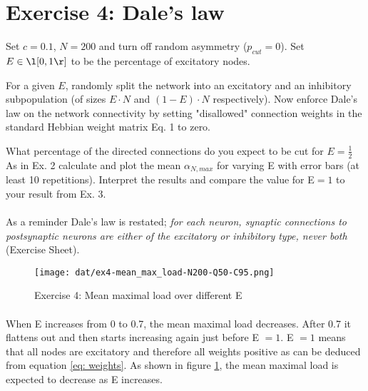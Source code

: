 \section{Exercise 4: Dale's law}

\begin{itshape}
\small
Set $c=0.1$, $N = 200$ and turn off random asymmetry ($p_{cut} = 0$). Set $E \in \l[0, 1\r]$ to be the percentage of excitatory nodes.

For a given $E$, randomly split the network into an excitatory and an inhibitory subpopulation (of sizes $E \cdot N$ and $(1 - E) \cdot N$ respectively). Now enforce Dale's law on the network connectivity by setting "disallowed" connection weights in the standard Hebbian weight matrix Eq. 1 to zero.

What percentage of the directed connections do you expect to be cut for $E = \frac{1}{2}$
As in Ex. 2 calculate and plot the mean $\alpha_{N,max}$ for varying E with error bars (at least 10 repetitions). Interpret the results and compare the value for E$ = 1$ to your result from Ex. 3.
\end{itshape}

\paragraph*{}

As a reminder Dale's law is restated; \textit{for each neuron, synaptic connections to postsynaptic neurons are either of the excitatory or inhibitory type, never both} (Exercise Sheet).

\begin{figure}[H]
  \begin{center}
    \texttt{[image: dat/ex4-mean\_max\_load-N200-Q50-C95.png]}
  \end{center}
  \vspace{-20pt}
  \caption{Exercise 4: Mean maximal load over different E}
  \label{fig: exercise 4}
\end{figure}

\paragraph*{}
When E increases from 0 to 0.7, the mean maximal load decreases. After 0.7 it flattens out and then starts increasing again just before E $= 1$. E $=1$ means that all nodes are excitatory and therefore all weights positive as can be deduced from equation \ref{eq: weights}. As shown in figure \ref{fig: exercise 4}, the mean maximal load is expected to decrease as E increases. 

